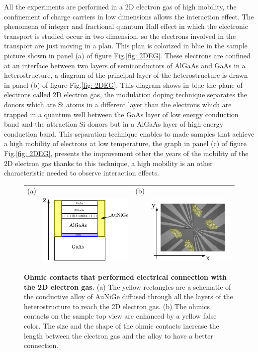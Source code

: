 All the experiments are performed in a 2D electron gas of high mobility, the confinement of charge carriers in low dimensions allows the interaction effect.
The phenomena of integer and fractional quantum Hall effect in which the electronic transport is studied occur in two dimension, so the electrons involved in the transport are just moving in a plan.
This plan is colorized in blue in the sample picture shown in panel (a) of figure Fig.\ref{fig: 2DEG}.
These electrons are confined at an interface between two layers of semiconductors of AlGaAs and GaAs in a heterostructure, a diagram of the principal layer of the heterostructure is drawn in panel (b) of figure Fig.\ref{fig: 2DEG}.
This diagram shows in blue the plane of electrons called 2D electron gas, the modulation doping technique separates the donors which are Si atoms in a different layer than the electrons which are trapped in a quantum well between the GaAs layer of low energy conduction band and the attraction Si donors but in a AlGaAs layer of high energy conduction band.
This separation technique enables to made samples that achieve a high mobility of electrons at low temperature, the graph in panel (c) of figure Fig.\ref{fig: 2DEG}, presents the improvement other the years of the mobility of the 2D electron gas thanks to this technique, a high mobility is an other characteristic needed to observe interaction effects.


\begin{figure}[hptb]
	\begin{center}
		\begin{tabular}{c c c c}
			(a) & & (b) & \\
			& \includegraphics[width = 4 cm]{./intro/ohmic_contact_cut_view}
			& &
			\includegraphics[width = 4 cm]{./intro/ohmic_contact_top_view} \\
		\end{tabular}
	\end{center}
	
	\caption{\textbf{Ohmic contacts that performed electrical connection with the 2D electron gas.} (a) The yellow rectangles are a schematic of the conductive alloy of AuNiGe diffused through all the layers of the heterostructure to reach the 2D electron gas. (b) The ohmics contacts on the sample top view are enhanced by a yellow false color. The size and the shape of the ohmic contacts increase the length between the electron gas and the alloy to have a better connection.}
	\label{fig: ohmic contact}
\end{figure}
 
